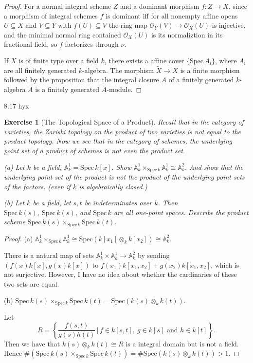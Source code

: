\documentclass[12pt]{amsart}
\newtheorem{exe}{Exercise}[subsection]
\begin{document}
\begin{proof}
For a normal integral scheme $Z$ and a dominant morphism $f: Z \rightarrow X$,  since a morphism of integral schemes $f$ is dominant  iff for all nonempty affine opens $U \subseteq X$ and $V \subseteq Y$ with $f(U) \subseteq V$ the ring map $\mathcal{O}_{Y}(V) \rightarrow \mathcal{O}_{X}(U)$ is injective,  and the minimal normal ring contained $\mathcal{O}_{X}(U)$ is its normaliztion in its fractional field,  so $f$ factorizes through $\nu$.

If $X$ is of finite type over a field $k$,  there exists a affine cover $\{\mathrm{Spec}\,A_{i}\}$,  where $A_{i}$ are all finitely generated $k$-algebra.  The morphism $\widetilde{X} \rightarrow X$ is a finite morphism followed by the proposition that the integral closure $A$ of a finitely generated $k$-algebra $A$ is a finitely generated $A$-module.
\end{proof}
8.17 hyx

\begin{exe}[The Topological Space of a Product]
	Recall that in the category of varieties, the Zariski topology on the product of two varieties is not equal to the product topology. Now we see that in the category of schemes, the underlying point set of a product of schemes is not even the product set.
	
	(a) Let $k$ be a field, $\mathbb{A}_k^1=\mathrm{Spec}\, k[x]$. Show $\mathbb{A}_k^1 \times_{\mathrm{Spec}\, k} \mathbb{A}_k^1\cong \mathbb{A}_k^2$. And show that the underlying
	point set of the product is not the product of the underlying point sets of the factors. (even if $k$ is algebraically closed.)
	
	(b) Let $k$ be a field, let $s,t$ be indeterminates over $k$. Then $\mathrm{Spec}\,k(s),\ \mathrm{Spec}\,k(s)$, and $\mathrm{Spec}\,k$ are all one-point spaces. Describe the product scheme $\mathrm{Spec}\, k(s)\times_{\mathrm{Spec}\, k}\mathrm{Spec}\, k(t)$.
\end{exe}

\begin{proof}
	(a) $\mathbb{A}_k^1 \times_{\mathrm{Spec}\, k} \mathbb{A}_k^1\cong \mathrm{Spec}(k[x_1]\otimes_k k[x_2])\cong \mathbb{A}_k^2$.
	
	There is a natural map of sets $\mathbb{A}_k^1\times\mathbb{A}_k^1\to\mathbb{A}_k^2$ by sending $(f(x)k[x],g(x)k[x])$ to $f(x_1)k[x_1,x_2]+g(x_2)k[x_1,x_2]$, which is not surjective. However, I have no idea about whether the cardinaries of these two sets are equal.
	
	(b) $\mathrm{Spec}\, k(s)\times_{\mathrm{Spec}\, k}\mathrm{Spec}\, k(t)=\mathrm{Spec} (k(s)\otimes _k k(t))$.
	
	Let $$R=\left\{\frac{f(s,t)}{g(s)h(t)}\,\Bigg|\,f\in k[s,t],\ g\in k[s]\text{ and }h\in k[t]\right\}.$$Then we have that $k(s)\otimes_k k(t)\cong R$ is a integral domain but is not a field. Hence $\#(\mathrm{Spec}\, k(s)\times_{\mathrm{Spec}\, k}\mathrm{Spec}\, k(t))=\#\mathrm{Spec} (k(s)\otimes _k k(t))>1$.
\end{proof}
\end{document}

